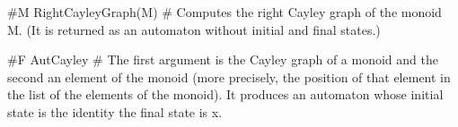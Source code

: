 #M RightCayleyGraph(M)  # Computes the right Cayley graph of the
 monoid M. (It is returned as an automaton without initial and final states.)

#F  AutCayley # The first argument is the Cayley graph of a monoid and
 the second an element of the monoid (more precisely, the position of
 that element in the list of the elements of the monoid). It produces
 an automaton whose initial state is the identity the final state is x.
